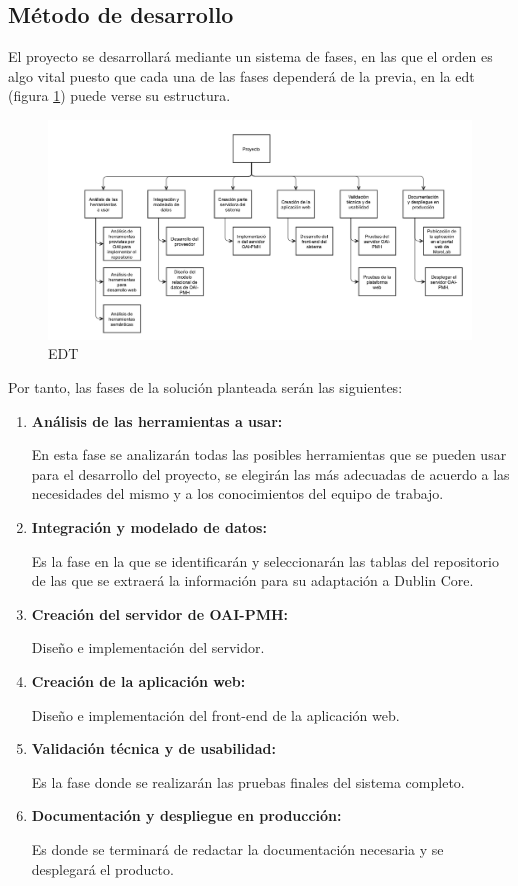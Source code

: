\subsection{Método de desarrollo}

El proyecto se desarrollará mediante un sistema de fases, en las que el orden es algo vital puesto que cada una de las fases dependerá de la previa, en la \acrfull{edt} (figura \ref{fig:edt}) puede verse su estructura.

\begin{figure}[!htp]
	\centering
	\includegraphics[angle=90, scale=.5]{fig/edt}
	\caption{EDT}\label{fig:edt}
\end{figure}

Por tanto, las fases de la solución planteada serán las siguientes:

\begin{enumerate}
	\item \textbf{Análisis de las herramientas a usar:}

	En esta fase se analizarán todas las posibles herramientas que se pueden usar para el desarrollo del proyecto, se elegirán las más adecuadas de acuerdo a las necesidades del mismo y a los conocimientos del equipo de trabajo.
	\item \textbf{Integración y modelado de datos:}

	Es la fase en la que se identificarán y seleccionarán las tablas del repositorio de las que se extraerá la información para su adaptación a Dublin Core.
	\item \textbf{Creación del servidor de OAI-PMH:}

	Diseño e implementación del servidor.
	\item \textbf{Creación de la aplicación web:}

	Diseño e implementación del front-end de la aplicación web. 
	\item \textbf{Validación técnica y de usabilidad:}

	Es la fase donde se realizarán las pruebas finales del sistema completo.
	\item \textbf{Documentación y despliegue en producción:}

	Es donde se terminará de redactar la documentación necesaria y se desplegará el producto.
\end{enumerate}